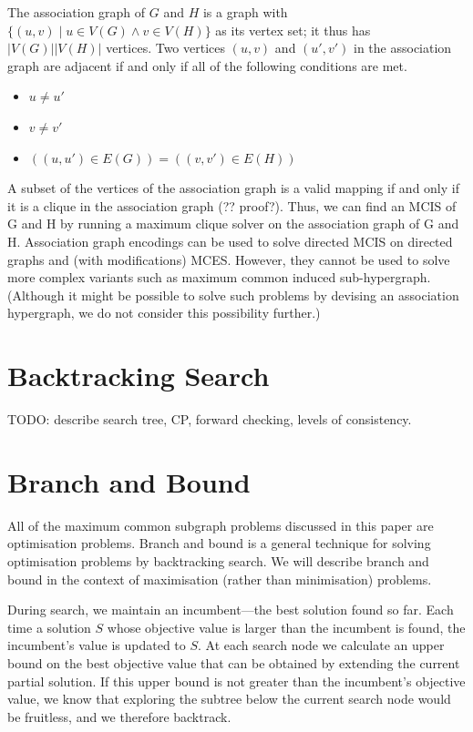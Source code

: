 The association graph of $G$ and $H$ is a graph with $\{(u,v) \mid u \in V(G) \wedge v \in
V(H)\}$ as its vertex set; it thus has $|V(G)||V(H)|$ vertices. Two vertices $(u,v)$
and $(u',v')$ in the association graph are adjacent if and only if all of the
following conditions are met.

\begin{itemize}
  \item $u \not= u'$
  \item $v \not= v'$
  \item $((u,u') \in E(G)) = ((v,v') \in E(H))$
\end{itemize}

A subset of the vertices of the association graph is a valid mapping if and
only if it is a clique in the association graph (?? proof?). Thus, we can find
an MCIS of G and H by running a maximum clique solver on the association graph
of G and H. Association graph encodings can be used to solve directed MCIS on
directed graphs and (with modifications) MCES. However, they cannot be used to
solve more complex variants such as maximum common induced sub-hypergraph.
(Although it might be possible to solve such problems by devising an
association hypergraph, we do not consider this possibility further.)

\section{Backtracking Search}

TODO: describe search tree, CP, forward checking, levels of consistency.

\section{Branch and Bound}

All of the maximum common subgraph problems discussed in this paper are
optimisation problems.  Branch and bound is a general technique for solving
optimisation problems by backtracking search. We will describe branch and bound
in the context of maximisation (rather than minimisation) problems.

During search, we maintain an incumbent---the best solution found so far. Each
time a solution $S$ whose objective value is larger than the incumbent is found,
the incumbent’s value is updated to $S$. At each search node we calculate an
upper bound on the best objective value that can be obtained by extending the
current partial solution. If this upper bound is not greater than the
incumbent’s objective value, we know that exploring the subtree below the
current search node would be fruitless, and we therefore backtrack.

